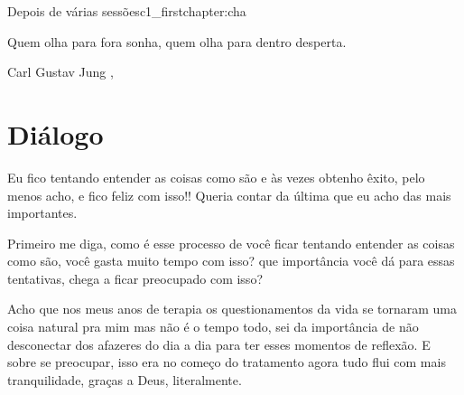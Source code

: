 


\begin{chapterpage}{Depois de várias sessões}{c1_firstchapter:cha}

\begin{myquotation} Quem olha para fora sonha, quem olha para dentro desperta.
\par\vspace*{15mm}
\mbox{}\hfill \emdash{}Carl Gustav Jung 
, %
\par\end{myquotation}

\end{chapterpage}



\section{Diálogo}\label{c1_basicformatting:sec}

\emdash{}Eu fico tentando entender as coisas como são e às vezes obtenho êxito, pelo menos acho, e fico feliz com isso!! Queria contar da última que eu acho das mais importantes.

\emdash{}Primeiro me diga, como é esse processo de você ficar tentando entender as coisas como são, você gasta muito tempo com isso? que importância você dá para essas tentativas, chega a ficar preocupado com isso?

\emdash{}Acho que nos meus anos de terapia os questionamentos da vida se tornaram uma coisa natural pra mim mas não é o tempo todo, sei da importância de não desconectar dos afazeres do dia a dia para ter esses momentos de reflexão. E sobre se preocupar, isso era no começo do tratamento agora tudo flui com mais tranquilidade, graças a Deus, literalmente.

